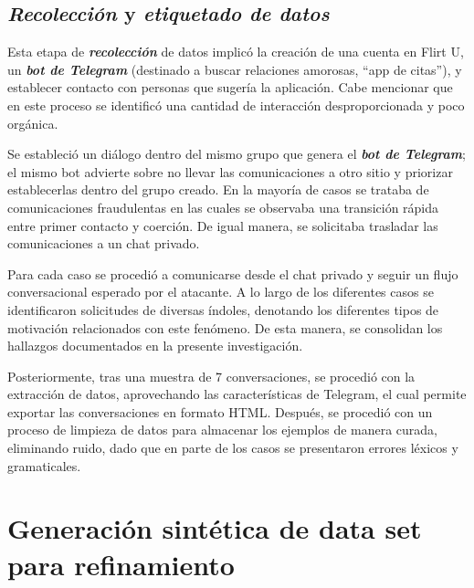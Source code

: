 \subsection{\textbf{\textit{Recolección}} y \textbf{\textit{etiquetado de datos}}}

Esta etapa de \textbf{\textit{recolección}} de datos implicó la creación de una cuenta en Flirt U, un \textbf{\textit{bot de Telegram}} (destinado a buscar relaciones amorosas, “app de citas”), y establecer contacto con personas que sugería la aplicación. Cabe mencionar que en este proceso se identificó una cantidad de interacción desproporcionada y poco orgánica.

Se estableció un diálogo dentro del mismo grupo que genera el \textbf{\textit{bot de Telegram}}; el mismo bot advierte sobre no llevar las comunicaciones a otro sitio y priorizar establecerlas dentro del grupo creado. En la mayoría de casos se trataba de comunicaciones fraudulentas en las cuales se observaba una transición rápida entre primer contacto y coerción. De igual manera, se solicitaba trasladar las comunicaciones a un chat privado.

Para cada caso se procedió a comunicarse desde el chat privado y seguir un flujo conversacional esperado por el atacante. A lo largo de los diferentes casos se identificaron solicitudes de diversas índoles, denotando los diferentes tipos de motivación relacionados con este fenómeno. De esta manera, se consolidan los hallazgos documentados en la presente investigación.

Posteriormente, tras una muestra de 7 conversaciones, se procedió con la extracción de datos, aprovechando las características de Telegram, el cual permite exportar las conversaciones en formato HTML. Después, se procedió con un proceso de limpieza de datos para almacenar los ejemplos de manera curada, eliminando ruido, dado que en parte de los casos se presentaron errores léxicos y gramaticales.

\section{Generación sintética de data set para refinamiento}

